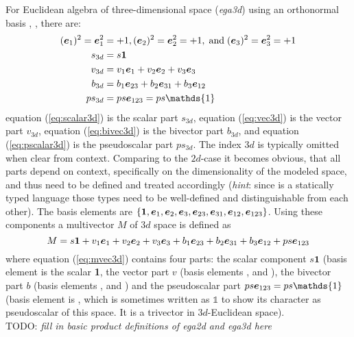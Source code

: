 For Euclidean algebra of three-dimensional space (\emph{ega3d}) using an orthonormal basis
, ,  there are:
\begin{subequations}
    \begin{align}
        (\bv{1})^2 = \bv{1}^2 & = +1, (\bv{2})^2 = \bv{2}^2 = +1,
        \;\text{and}\; (\bv{3})^2 = \bv{3}^2 = +1
        \label{eq:ega3d_base_vec} \\ 
        s_{3d} & = s\bm{1}
        \label{eq:scalar3d} \\
        v_{3d} & = v_1\bv{1} + v_2\bv{2} + v_3\bv{3} 
        \label{eq:vec3d} \\ 
        b_{3d} & = b_1\bv{23} + b_2\bv{31} + b_3\bv{12} 
        \label{eq:bivec3d} \\ 
        ps_{3d} & = ps \bv{123}  = ps\mathds{1}
        \label{eq:pscalar3d}
    \end{align}
\end{subequations}
equation (\ref{eq:scalar3d}) is the scalar part $s_{3d}$, equation (\ref{eq:vec3d}) is the
vector part $v_{3d}$, equation (\ref{eq:bivec3d}) is the bivector part $b_{3d}$, and
equation (\ref{eq:pscalar3d}) is the pseudoscalar part $ps_{3d}$. The index $3d$ is
typically omitted when clear from context. Comparing to the $2d$-case it becomes obvious,
that all parts depend on context, specifically on the dimensionality of the modeled space,
and thus need to be defined and treated accordingly (\emph{hint}: since \Cpp is a
statically typed language those types need to be well-defined and distinguishable from
each other). The basis elements are $\{\bm{1}, \bm{e}_{1}, \bm{e}_{2}, \bm{e}_{3}, \bm{e}_{23}, \bm{e}_{31},
\bm{e}_{12}, \bm{e}_{123}\}$. Using these components a multivector $M$ of $3d$ space is defined as
\begin{equation}
    M = s \bm{1} + v_1\bm{e}_{1} + v_2\bm{e}_{2} + v_3\bm{e}_{3} 
    + b_1\bm{e}_{23} + b_2\bm{e}_{31} + b_3\bm{e}_{12} + ps\bm{e}_{123}
    \label{eq:mvec3d}  
\end{equation}
where equation (\ref{eq:mvec3d}) contains four parts: the scalar component $s\bm{1}$
(basis element is the scalar \textbf{1}, the vector part $v$ (basis elements ,
 and ), the bivector part $b$ (basis elements ,  and )
and the pseudoscalar part $ps \bv{123} = ps \mathds{1}$ (basis element is , which
is sometimes written as $\mathds{1}$ to show its character as pseudoscalar of this space.
It is a trivector in $3d$-Euclidean space). \\

TODO: \emph{fill in basic product definitions of ega2d and ega3d here} \\

